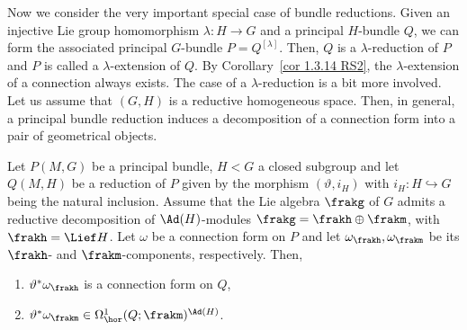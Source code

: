 


Now we consider the very important special case of bundle reductions. Given an injective Lie group homomorphism $\lambda:H\to G$ and a principal $H$-bundle $Q$, we can form the associated principal $G$-bundle $P=Q^{[\lambda]}$. Then, $Q$ is a $\lambda$-reduction of $P$ and $P$ is called a $\lambda$-extension of $Q$. By Corollary~\ref{cor 1.3.14 RS2}, the $\lambda$-extension of a connection always exists. The case of a $\lambda$-reduction is a bit more involved. Let us assume that $(G,H)$ is a reductive homogeneous space. Then, in general, a principal bundle reduction induces a decomposition of a connection form into a pair of geometrical objects.

\begin{prop}[{{\cite[Prop.~1.6.8]{RS2}}}]\label{prop 1.6.8 RS2}
    Let $P(M,G)$ be a principal bundle, $H<G$ a closed subgroup and let $Q(M,H)$ be a reduction of $P$ given by the morphism $(\vartheta,i_H)$ with $i_H:H\hookrightarrow G$ being the natural inclusion. Assume that the Lie algebra $\frakg$ of $G$ admits a reductive decomposition of $\Ad(H)$-modules
    $\frakg=\frakh\oplus\frakm$,
    with $\frakh=\Lief H$. Let $\omega$ be a connection form on $P$ and let $\omega_\frakh,\omega_\frakm$ be its $\frakh$- and $\frakm$-components, respectively. Then,
    \begin{enumerate}
        \item $\vartheta^\ast\omega_\frakh$ is a connection form on $Q$,
        \item $\vartheta^\ast\omega_\frakm\in \Omega^1_{\hor}(Q;\frakm)^{\Ad(H)}$.
    \end{enumerate}
\end{prop}
